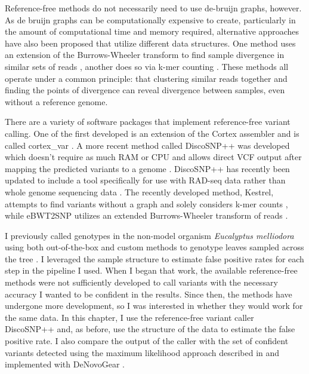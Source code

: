 Reference-free methods do not necessarily need to use de-bruijn graphs, however. As de bruijn graphs can be computationally expensive to create, particularly in the amount of computational time and memory required, alternative approaches have also been proposed that utilize different data structures. One method uses an extension of the Burrows-Wheeler transform to find sample divergence in similar sets of reads \parencite{prezza_snps_2019}, another does so via k-mer counting \parencite{audano_mapping-free_2018}. These methods all operate under a common  principle: that clustering similar reads together and finding the points of divergence can reveal divergence between samples, even without a reference genome.

There are a variety of software packages that implement reference-free variant calling. One of the first developed is an extension of the Cortex assembler and is called cortex\_var \parencite{iqbal_novo_2012}. A more recent method called DiscoSNP++ was developed which doesn't require as much RAM or CPU and allows direct VCF output after mapping the predicted variants to a genome \parencite{peterlongo_discosnp_2017}. DiscoSNP++ has recently been updated to include a tool specifically for use with RAD-seq data rather than whole genome sequencing data \parencite{gauthier_discosnp-rad_2020}. The recently developed method, Kestrel, attempts to find variants without a graph and solely considers k-mer counts \parencite{audano_mapping-free_2018}, while eBWT2SNP \parencite{prezza_snps_2019} utilizes an extended Burrows-Wheeler transform of reads \parencite{mantaci_extension_2007}.

I previously called genotypes in the non-model organism \textit{Eucalyptus melliodora} using both out-of-the-box and custom methods to genotype leaves sampled across the tree \parencite{orr_phylogenomic_2020}. I leveraged the sample structure to estimate false positive rates for each step in the pipeline I used. When I began that work, the available reference-free methods were not sufficiently developed to call variants with the necessary accuracy I wanted to be confident in the results. Since then, the methods have undergone more development, so I was interested in whether they would work for the same data. In this chapter, I use the reference-free variant caller DiscoSNP++ \parencite{peterlongo_discosnp_2017} and, as before, use the structure of the data to estimate the false positive rate. I also compare the output of the caller with the set of confident variants detected using the maximum likelihood approach described in \parencite{orr_phylogenomic_2020} and implemented with DeNovoGear \parencite{ramu_denovogear_2013}.


